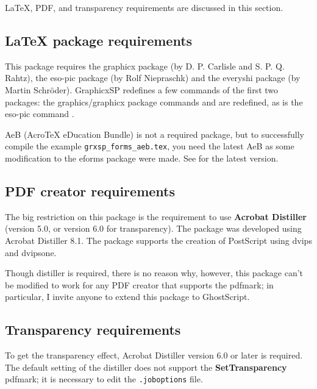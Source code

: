 \documentclass{article}
\let\pkg\textsf
\let\app\textsf
\begin{document}
{\LaTeX}, PDF, and transparency requirements are discussed in this section.

\subsection{{\LaTeX} package requirements}

This package requires the \pkg{graphicx} package (by D. P. Carlisle and S. P. Q.
Rahtz), the \pkg{eso-pic} package (by Rolf Niepraschk) and the \pkg{everyshi}
package (by Martin Schr\"oder). \pkg{GraphicxSP} redefines a few commands of the
first two packages: the \pkg{graphics}/\pkg{graphicx} package commands 
and  are redefined, as is the \pkg{eso-pic} command .

\pkg{AeB} (Acro\negthinspace\TeX{} eDucation Bundle) is not a required
package, but to successfully compile the example
\texttt{grxsp\_forms\_aeb.tex}, you need the latest \pkg{AeB} as some
modification to the eforms package were made. See
 for the latest
version.

\subsection{PDF creator requirements}

The big restriction on this package is the requirement to use
\textbf{Acrobat Distiller} (version 5.0, or version 6.0 for transparency).
The package was developed using Acrobat Distiller 8.1. The package supports the
creation of PostScript using \app{dvips} and \app{dvipsone}.

Though distiller is required, there is no reason why, however, this
package can't be modified to work for any PDF creator that supports
the pdfmark; in particular, I invite anyone to extend this package
to \app{GhostScript}.

\subsection{Transparency requirements}

To get the transparency effect, \app{Acrobat Distiller} version 6.0 or
later is required. The default setting of the distiller does not
support the \textbf{SetTransparency} pdfmark; it is necessary to
edit the \texttt{.joboptions} file.
\end{document}
